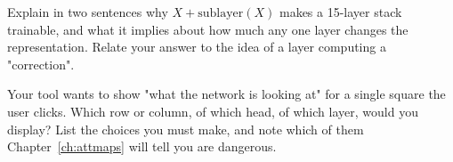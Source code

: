 \begin{exercises}
 Explain in two sentences why $X + \text{sublayer}(X)$ makes
a 15-layer stack trainable, and what it implies about how much any one layer changes the
representation. Relate your answer to the idea of a layer computing a "correction".

 Your tool wants to show "what the network is looking at" for a
single square the user clicks. Which row or column, of which head, of which layer, would you
display? List the choices you must make, and note which of them Chapter~\ref{ch:attmaps} will
tell you are dangerous.

\end{exercises}
